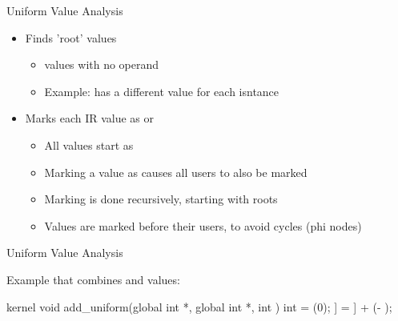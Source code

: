 
\begin{frame}{Uniform Value Analysis}

\begin{itemize}
    \item Finds 'root' values
    \begin{itemize}
        \item {} values with no  operand
        \item Example:  has a different value for each isntance
    \end{itemize}
    \item Marks each IR value as  or 
    \begin{itemize}
        \item All values start as 
        \item Marking a value as  causes all users to also be marked 
        \item Marking is done recursively, starting with roots
        \item Values are marked before their users, to avoid cycles (phi nodes)
    \end{itemize}
\end{itemize}

\end{frame}


\begin{frame}[fragile]{Uniform Value Analysis}

Example that combines  and  values:

\begin{codebox}[commandchars=\\\[\]]
kernel void add_uniform(global int *\uniform[dst], global int *\uniform[src], int \uniform[alpha]) {
    int \varying[tid] = (0);
    \uniform[dst]\idx[\varying[tid]] = \uniform[src]\idx[\varying[tid]] + (\uniform[alpha] - \uniform[1]);
}
\end{codebox}


\end{frame}

